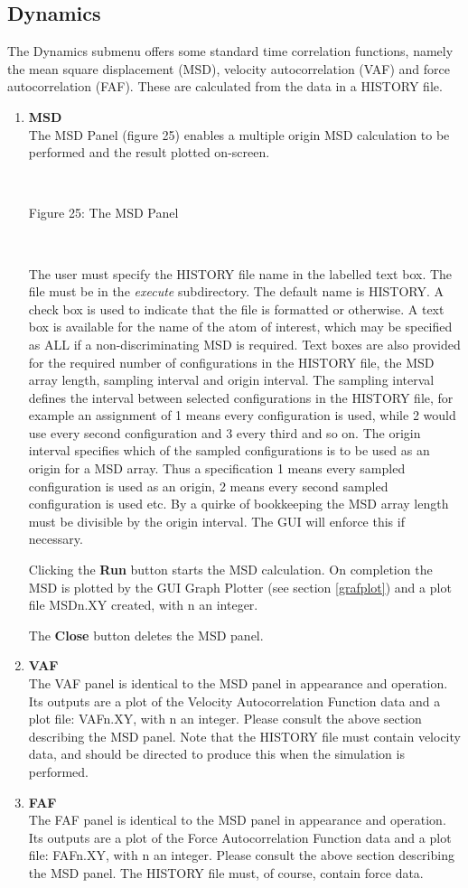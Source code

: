 \subsection{Dynamics}
The Dynamics submenu offers some standard time correlation functions,
namely the mean square displacement (MSD), velocity autocorrelation
(VAF) and force autocorrelation (FAF). These are calculated from the
data in a \DD{} HISTORY file.
\begin{enumerate}
\item {\bf MSD}\\
The MSD Panel (figure 25) enables a multiple origin MSD calculation to be
performed and the result plotted on-screen.

~

\vskip 5mm
\centerline{}
\centerline{Figure 25: The MSD Panel}
\vskip 5mm

~

\noindent
The user must specify the HISTORY file name in the labelled text
box. The file must be in the \DD{} {\em execute} subdirectory. The
default name is HISTORY. A check box is used to indicate that the file
is formatted or otherwise. A text box is available for the name of the
atom of interest, which may be specified as ALL if a
non-discriminating MSD is required. Text boxes are also provided for
the required number of configurations in the HISTORY file, the MSD
array length, sampling interval and origin interval. The sampling
interval defines the interval between selected configurations in the
HISTORY file, for example an assignment of 1 means every configuration
is used, while 2 would use every second configuration and 3 every
third and so on. The origin interval specifies which of the sampled
configurations is to be used as an origin for a MSD array. Thus a
specification 1 means every sampled configuration is used as an
origin, 2 means every second sampled configuration is used etc. By a
quirke of bookkeeping the MSD array length must be divisible by the
origin interval. The GUI will enforce this if necessary.

Clicking the {\bf Run} button starts the MSD calculation. On
completion the MSD is plotted by the GUI Graph Plotter (see section
\ref{grafplot}) and a plot file MSDn.XY created, with n an integer.

The {\bf Close} button deletes the MSD panel.
\item {\bf VAF}\\
The VAF panel is identical to the MSD panel in appearance and
operation. Its outputs are a plot of the Velocity Autocorrelation
Function data and a plot file: VAFn.XY, with n an integer. Please
consult the above section describing the MSD panel. Note that the
HISTORY file must contain velocity data, and \DD{} should be directed to
produce this when the simulation is performed.

\item {\bf FAF}\\
The FAF panel is identical to the MSD panel in appearance and
operation. Its outputs are a plot of the Force Autocorrelation
Function data and a plot file: FAFn.XY, with n an integer. Please
consult the above section describing the MSD panel. The HISTORY file
must, of course, contain force data.
\end{enumerate}
